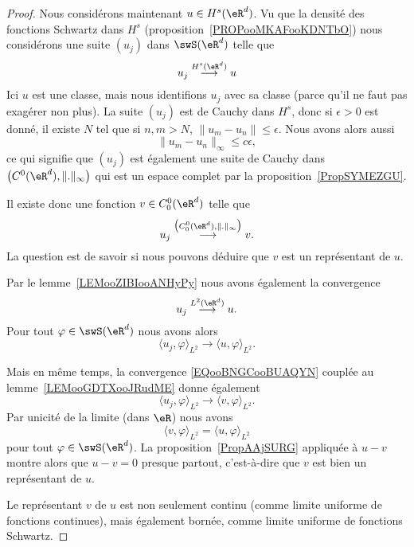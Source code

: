 \begin{proof}
	Nous considérons maintenant \( u\in H^s(\eR^d)\). Vu que la densité des fonctions Schwartz dans \( H^s\) (proposition~\ref{PROPooMKAFooKDNTbO}) nous considérons une suite \( (u_j)\) dans \( \swS(\eR^d)\) telle que
	\begin{equation}
		u_j\stackrel{H^s(\eR^d)}{\longrightarrow}u
	\end{equation}
	Ici \( u\) est une classe, mais nous identifions \( u_j\) avec sa classe (parce qu'il ne faut pas exagérer non plus). La suite \( (u_j)\) est de Cauchy dans \( H^s\), donc si \( \epsilon>0\) est donné, il existe \( N\) tel que si \( n,m>N\), \( \| u_m-u_n \|\leq \epsilon\). Nous avons alors aussi
	\begin{equation}
		\| u_m-u_n \|_{\infty}\leq c\epsilon,
	\end{equation}
	ce qui signifie que \( (u_j)\) est également une suite de Cauchy dans \( \big( C^0(\eR^d),\| . \|_{\infty} \big)\) qui est un espace complet par la proposition~\ref{PropSYMEZGU}.

	Il existe donc une fonction \( v\in C_0^0(\eR^d)\) telle que
	\begin{equation}        \label{EQooBNGCooBUAQYN}
		u_j\stackrel{\big( C^0_0(\eR^d), \| . \|_{\infty} \big)}{\longrightarrow}v.
	\end{equation}
	La question est de savoir si nous pouvons déduire que \( v\) est un représentant de \( u\).

	Par le lemme~\ref{LEMooZIBIooANHyPy} nous avons également la convergence
	\begin{equation}
		u_j\stackrel{L^2(\eR^d)}{\longrightarrow} u.
	\end{equation}
	Pour tout \( \varphi\in \swS(\eR^d)\) nous avons alors
	\begin{equation}
		\langle u_j, \varphi\rangle_{L^2}\to\langle u, \varphi\rangle_{L^2}.
	\end{equation}

	Mais en même temps, la convergence \eqref{EQooBNGCooBUAQYN} couplée au lemme~\ref{LEMooGDTXooJRudME} donne également
	\begin{equation}
		\langle u_j, \varphi\rangle_{L^2}\to \langle v, \varphi\rangle_{L^2}.
	\end{equation}
	Par unicité de la limite (dans \( \eR\)) nous avons
	\begin{equation}
		\langle v, \varphi\rangle_{L^2}=\langle u, \varphi\rangle_{L^2}
	\end{equation}
	pour tout \( \varphi\in\swS(\eR^d)\). La proposition~\ref{PropAAjSURG} appliquée à \( u-v\) montre alors que \( u-v=0\) presque partout, c'est-à-dire que \( v\) est bien un représentant de \( u\).

	Le représentant \( v\) de \( u\) est non seulement continu (comme limite uniforme de fonctions continues), mais également bornée, comme limite uniforme de fonctions Schwartz.
\end{proof}

